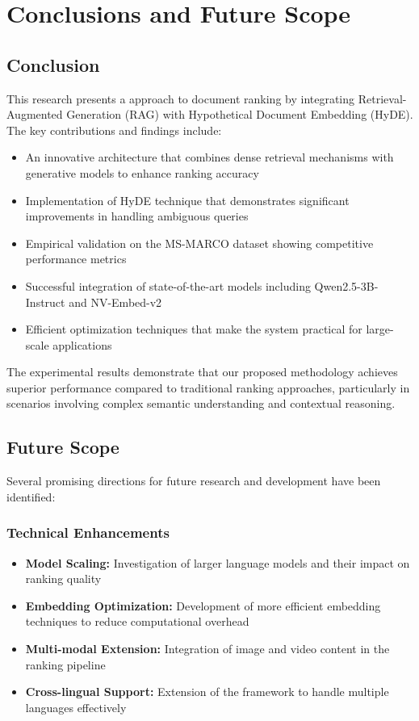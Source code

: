 \chapter{Conclusions and Future Scope }
\label{C5} %
\clearpage

\section{Conclusion}
This research presents a approach to document ranking by integrating Retrieval-Augmented Generation (RAG)\cite{rag} with Hypothetical Document Embedding (HyDE)\cite{hyde}. The key contributions and findings include:

\begin{itemize}
    \item An innovative architecture that combines dense retrieval mechanisms with generative models to enhance ranking accuracy
    \item Implementation of HyDE technique that demonstrates significant improvements in handling ambiguous queries
    \item Empirical validation on the MS-MARCO\cite{ms} dataset showing competitive performance metrics
    \item Successful integration of state-of-the-art models including Qwen2.5-3B-Instruct and NV-Embed-v2
    \item Efficient optimization techniques that make the system practical for large-scale applications
\end{itemize}

The experimental results demonstrate that our proposed methodology achieves superior performance compared to traditional ranking approaches, particularly in scenarios involving complex semantic understanding and contextual reasoning.

\section{Future Scope}
Several promising directions for future research and development have been identified:

\subsection{Technical Enhancements}
\begin{itemize}
    \item \textbf{Model Scaling:} Investigation of larger language models and their impact on ranking quality
    \item \textbf{Embedding Optimization:} Development of more efficient embedding techniques to reduce computational overhead
    \item \textbf{Multi-modal Extension:} Integration of image and video content in the ranking pipeline
    \item \textbf{Cross-lingual Support:} Extension of the framework to handle multiple languages effectively
\end{itemize}


